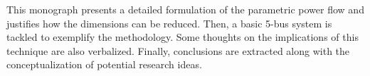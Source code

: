 This monograph presents a detailed formulation of the parametric power flow and justifies how the dimensions can be reduced. Then, a basic 5-bus system is tackled to exemplify the methodology. Some thoughts on the implications of this technique are also verbalized. Finally, conclusions are extracted along with the conceptualization of potential research ideas. 
